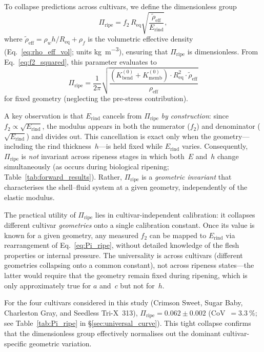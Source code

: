 To collapse predictions across cultivars, we define the dimensionless
group
\begin{equation}
  \Pi_{\mathrm{ripe}} = f_2 \, R_{\mathrm{eq}}
    \sqrt{\frac{\tilde{\rho}_{\mathrm{eff}}}{E_{\mathrm{rind}}}},
  \label{eq:Pi_ripe}
\end{equation}
where $\tilde{\rho}_{\mathrm{eff}} = \rho_w h / R_{\mathrm{eq}} +
\rho_f$ is the volumetric effective density
(Eq.~\ref{eq:rho_eff_vol}; units \si{\kilogram\per\metre\cubed}),
ensuring that $\Pi_{\mathrm{ripe}}$ is dimensionless.
From Eq.~\eqref{eq:f2_squared}, this parameter evaluates to
\begin{equation}
  \Pi_{\mathrm{ripe}} = \frac{1}{2\pi}
    \sqrt{\frac{(K_{\mathrm{bend}}^{(0)} + K_{\mathrm{memb}}^{(0)})
    \cdot R_{\mathrm{eq}}^2 \cdot \tilde{\rho}_{\mathrm{eff}}}
    {\rho_{\mathrm{eff}}}}
  \label{eq:Pi_ripe_universal}
\end{equation}
for fixed geometry (neglecting the pre-stress contribution).

A key observation is that $E_{\mathrm{rind}}$ cancels from
$\Pi_{\mathrm{ripe}}$ \emph{by construction}: since $f_2 \propto
\sqrt{E_{\mathrm{rind}}}$, the modulus appears in both the numerator
($f_2$) and denominator ($\sqrt{E_{\mathrm{rind}}}$) and divides out.
This cancellation is exact only when the geometry---including the rind
thickness~$h$---is held fixed while $E_{\mathrm{rind}}$ varies.
Consequently, $\Pi_{\mathrm{ripe}}$ is \emph{not} invariant across
ripeness stages in which both~$E$ and~$h$ change simultaneously
(as occurs during biological ripening;
Table~\ref{tab:forward_results}).
Rather, $\Pi_{\mathrm{ripe}}$ is a
\emph{geometric invariant} that characterises the shell--fluid system
at a given geometry, independently of the elastic modulus.

The practical utility of $\Pi_{\mathrm{ripe}}$ lies in
cultivar-independent calibration: it collapses different cultivar
\emph{geometries} onto a single calibration constant.  Once its value is
known for a given geometry, any measured $f_2$ can be mapped to
$E_{\mathrm{rind}}$ via rearrangement of Eq.~\eqref{eq:Pi_ripe},
without detailed knowledge of the flesh properties or internal pressure.
The universality is across cultivars (different geometries collapsing
onto a common constant), not across ripeness states---the latter would
require that the geometry remain fixed during ripening, which is only
approximately true for $a$ and~$c$ but not for~$h$.

For the four cultivars considered in this study (Crimson Sweet, Sugar
Baby, Charleston Gray, and Seedless Tri-X~313),
$\Pi_{\mathrm{ripe}} = 0.062 \pm 0.002$ (CoV~$= \SI{3.3}{\percent}$;
see Table~\ref{tab:Pi_ripe} in \S\ref{sec:universal_curve}).  This
tight collapse confirms that the dimensionless group effectively
normalises out the dominant cultivar-specific geometric variation.
